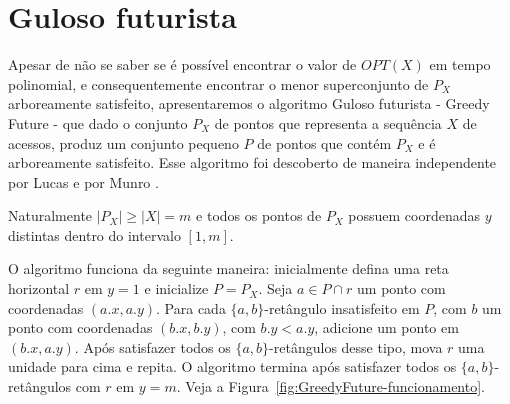 \section{Guloso futurista}

Apesar de não se saber se é possível encontrar o valor de $OPT(X)$ em tempo polinomial, e consequentemente encontrar o menor superconjunto de $P_X$ arboreamente satisfeito, apresentaremos o algoritmo Guloso futurista - Greedy Future - que dado o conjunto $P_X$ de pontos que representa a sequência $X$ de acessos, produz um conjunto pequeno $P$ de pontos que contém $P_X$ e é arboreamente satisfeito. Esse algoritmo foi descoberto de maneira independente por Lucas \cite{lucas} e por Munro \cite{munro}.

Naturalmente $|P_X| \geq |X| = m$ e todos os pontos de $P_X$ possuem coordenadas $y$ distintas dentro do intervalo $[1,m]$. 

O algoritmo funciona da seguinte maneira: inicialmente defina uma reta horizontal $r$ em $y = 1$ e inicialize $P = P_X$. Seja $a \in P \cap r$ um ponto com coordenadas $(a.x, a.y)$. Para cada $\{a,b\}$-retângulo insatisfeito em $P$, com $b$ um ponto com coordenadas $(b.x, b.y)$, com $b.y < a.y$, adicione um ponto em $(b.x, a.y)$. Após satisfazer todos os $\{a,b\}$-retângulos desse tipo, mova $r$ uma unidade para cima e repita. O algoritmo termina após satisfazer todos os $\{a,b\}$-retângulos com $r$ em $y = m$. Veja a Figura~\ref{fig:GreedyFuture-funcionamento}.

